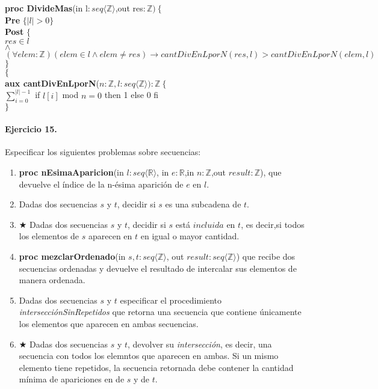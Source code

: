 \documentclass[a4paper]{article}
\begin{document}
\begin{enumerate}[label=\alph*)]
			\textbf{proc DivideMas}(in l$:seq\langle \mathbb{Z}\rangle$,out res$:\mathbb{Z} )\ 
			\{$\smallskip \\
			\hspace*{6mm} \textbf{Pre }$\{ |l|>0\}$\smallskip \\
			\hspace*{6mm} \textbf{Post }$\{$\\
			\hspace*{6mm} $res\in l$\\
			\hspace*{6mm} $\wedge$\\
			\hspace*{6mm} $(\forall elem:\mathbb{Z})(elem \in l\wedge elem\neq res)\rightarrow
			cantDivEnLporN(res,l)>cantDivEnLporN(elem,l)$\\
			\hspace*{6mm} $\}$\\
			$\{$\smallskip \\
			
			\textbf{aux cantDivEnLporN}($n:\mathbb{Z},l: seq\langle \mathbb{Z}\rangle):\mathbb{Z}
			\ \{$\smallskip \\
			\hspace*{6mm}$\sum_{i=0}^{|l|-1}$ if $l[i]$ mod $n=0$ then 1 else 0 fi\\
			$\}$	
	\end{enumerate}
	
\paragraph*{Ejercicio 15.} Especificar los siguientes problemas sobre secuencias:
	\begin{enumerate}[label=\alph*)]
		\item \textbf{proc nEsimaAparicion}(in $l:seq\langle \mathbb{R}\rangle$,
			in $e:\mathbb{R}$,in $n:\mathbb{Z}$,out $result:\mathbb{Z}$), que devuelve
			el índice de la n-ésima aparición de $e$ en $l$.
		\item Dadas dos secuencias $s$ y $t$, decidir si $s$ es una subcadena de $t$.
		\item $\bigstar$ Dadas dos secuencias $s$ y $t$, decidir si $s$ está $incluida$ 
		en $t$, es decir,si todos los elementos de $s$ aparecen en $t$ en igual o mayor cantidad.
		\item \textbf{proc mezclarOrdenado}(in $s,t:seq\langle \mathbb{Z}\rangle$,
		out $result:seq\langle \mathbb{Z}\rangle$) que recibe dos secuencias ordenadas y devuelve
			el resultado de intercalar sus elementos de manera ordenada.
		\item Dadas dos secuencias $s$ y $t$ especificar el procedimiento 
				\textit{intersecciónSinRepetidos} que retorna una secuencia que contiene
				únicamente los elementos que aparecen en ambas secuencias.
		\item $\bigstar$ Dadas dos secuencias $s$ y $t$, devolver su \textit{intersección}, es
				decir, una secuencia con todos los elemntos que aparecen en ambas. Si un mismo
				elemento tiene repetidos, la secuencia retornada debe contener la cantidad
				mínima de apariciones en de $s$ y de $t$.
	\end{enumerate}
\end{document}
